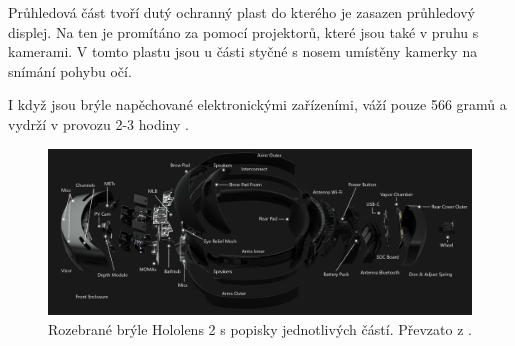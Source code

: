 Průhledová část tvoří dutý ochranný plast do kterého je zasazen průhledový displej. Na ten je promítáno za pomocí projektorů, které jsou také v pruhu s kamerami. V tomto plastu jsou u části styčné s nosem umístěny kamerky na snímání pohybu očí.

I když jsou brýle napěchované elektronickými zařízeními, váží pouze 566 gramů a vydrží v provozu 2-3 hodiny \cite{hololens2ms}.
\begin{figure}[ht] %
	\centering
	\includegraphics[width=\textwidth]{obrazky-figures/ar/hololensDescription.png}
	\caption{Rozebrané brýle Hololens 2 s popisky jednotlivých částí. Převzato z \cite{hololens2ms}.}
	\label{pic:hololens2}
\end{figure}


